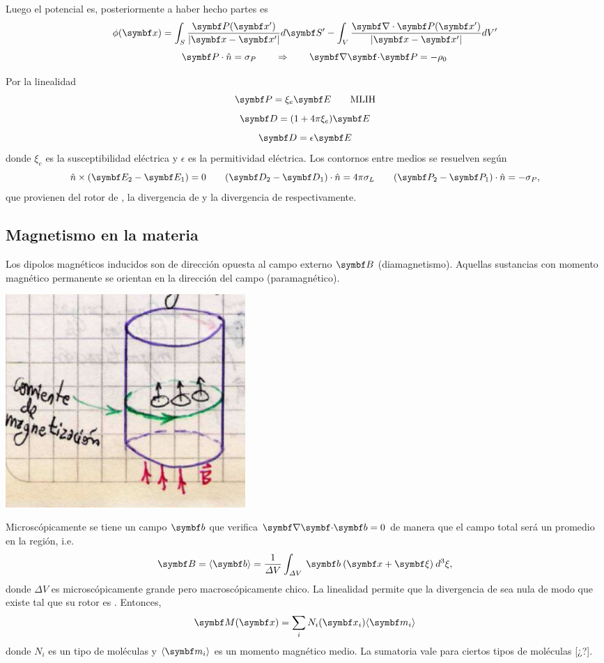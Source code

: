 \documentclass[10pt,oneside]{CBFT_book}
\begin{document}
Luego el potencial es, posteriormente a haber hecho partes
es
\[
	\phi( \vb{x}) = \int_S \frac{\vb{P}(\vb{x}')}{|\vb{x}-\vb{x}'|} d\vb{S}' - 
	\int_V \frac{\Nabla\cdot\vb{P}(\vb{x}')}{|\vb{x}-\vb{x}'|}  dV'
\]
\[
	\qquad \vb{P}\cdot\hat{n} = \sigma_P \qquad \Rightarrow \qquad \divem{P} = -\rho_0
\]

Por la linealidad
\[
	\vb{P} = \xi_e \vb{E} \qquad \text{MLIH}
\]
\[
	\vb{D} = ( 1 + 4\pi\xi_e ) \vb{E} 
\]
\[
	\vb{D} = \epsilon \vb{E}
\]
donde $\xi_e$ es la susceptibilidad eléctrica y $\epsilon$ es la permitividad eléctrica.
Los contornos entre medios se resuelven según
\[
	\hat{n} \times (\vb{E}_2 -\vb{E}_1) = 0 \qquad 
	(\vb{D}_2 -\vb{D}_1)\cdot\hat{n} = 4 \pi \sigma_L \qquad 
	(\vb{P}_2 -\vb{P}_1)\cdot\hat{n} = - \sigma_P,
\]
que provienen del rotor de , la divergencia de  y la divergencia
de  respectivamente.

\subsection{Magnetismo en la materia}

Los dipolos magnéticos inducidos son de dirección opuesta al campo externo $\vb{B}$ 
(diamagnetismo).
Aquellas sustancias con momento magnético permanente se orientan en la dirección del
campo  (paramagnético).

\includegraphics[width=0.4\textwidth]{images/fig_ft1_imaninducidos.jpg}

Microscópicamente se tiene un campo $\vb{b}$ que verifica $\divem{b}=0$ de manera 
que el campo total será un promedio en la región, i.e.
\[
	\vb{B} = \langle \vb{b} \rangle = 
	\frac{1}{\Delta V} \int_{\Delta V} \: \vb{b} \: (\vbx + \vb{\xi} ) \: d^3\xi,
\]
donde $\Delta V$ es microscópicamente grande pero macroscópicamente chico.
La linealidad permite que la divergencia de  sea nula de modo que existe 
tal que su rotor es .
Entonces,
\[
	\vb{M}(\vbx) = \sum_i N_i(\vbx_i) \langle \vb{m}_i \rangle
\]
donde $N_i$ es un tipo de moléculas y $ \langle \vb{m}_i \rangle$ es un momento magnético
medio. La sumatoria vale para ciertos tipos de moléculas [¿?].
\end{document}
